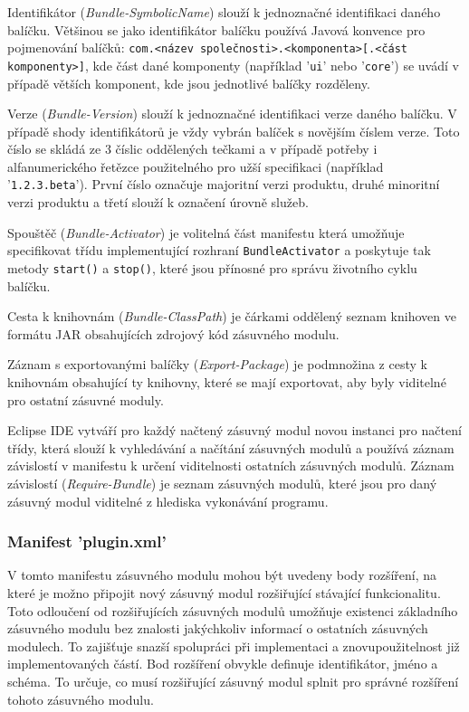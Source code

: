       Identifikátor (\emph{Bundle-SymbolicName}) slouží k jednoznačné identifikaci daného balíčku. Většinou se jako identifikátor balíčku používá Javová konvence pro pojmenování balíčků: \texttt{com.<název společnosti>.<komponenta>[.<část komponenty>]}, kde část dané komponenty (například '\texttt{ui}' nebo '\texttt{core}') se uvádí v případě větších komponent, kde jsou jednotlivé balíčky rozděleny.
      
      Verze (\emph{Bundle-Version}) slouží k jednoznačné identifikaci verze daného balíčku. V případě shody identifikátorů je vždy vybrán balíček s novějším číslem verze. Toto číslo se skládá ze 3 číslic oddělených tečkami a v případě potřeby i alfanumerického řetězce použitelného pro užší specifikaci (například '\texttt{1.2.3.beta}'). První číslo označuje majoritní verzi produktu, druhé minoritní verzi produktu a třetí slouží k označení úrovně služeb.

      Spouštěč (\emph{Bundle-Activator}) je volitelná část manifestu která umožňuje specifikovat třídu implementující rozhraní \texttt{BundleActivator} a poskytuje tak metody \texttt{start()} a \texttt{stop()}, které jsou přínosné pro správu životního cyklu balíčku.

      Cesta k knihovnám (\emph{Bundle-ClassPath}) je čárkami oddělený seznam knihoven ve formátu JAR obsahujících zdrojový kód zásuvného modulu.

      Záznam s exportovanými balíčky (\emph{Export-Package}) je podmnožina z cesty k knihovnám obsahující ty knihovny, které se mají exportovat, aby byly viditelné pro ostatní zásuvné moduly.


      Eclipse IDE vytváří pro každý načtený zásuvný modul novou instanci pro načtení třídy, která slouží k vyhledávání a načítání zásuvných modulů a používá záznam závislostí v manifestu k určení viditelnosti ostatních zásuvných modulů. Záznam závislostí (\emph{Require-Bundle}) je seznam zásuvných modulů, které jsou pro daný zásuvný modul viditelné z hlediska vykonávání programu.

      \subsubsection{Manifest 'plugin.xml'}
      V tomto manifestu zásuvného modulu mohou být uvedeny body rozšíření, na které je možno připojit nový zásuvný modul rozšiřující stávající funkcionalitu. Toto odloučení od rozšiřujících zásuvných modulů umožňuje existenci základního zásuvného modulu bez znalosti jakýchkoliv informací o ostatních zásuvných modulech. To zajišťuje snazší spolupráci při implementaci a znovupoužitelnost již implementovaných částí. Bod rozšíření obvykle definuje identifikátor, jméno a schéma. To určuje, co musí rozšiřující zásuvný modul splnit pro správné rozšíření tohoto zásuvného modulu.
      
